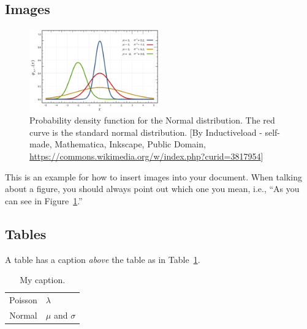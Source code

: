 \documentclass[12pt]{article}
\begin{document}
\subsection{Images}
\begin{figure}
    \begin{center}
    \includegraphics[width=0.5\textwidth]{figures/Normal_Distribution_PDF.pdf} %
    \caption{Probability density function for the Normal distribution. The red curve is the standard normal distribution. [By Inductiveload - self-made, Mathematica, Inkscape, Public Domain, \url{https://commons.wikimedia.org/w/index.php?curid=3817954}]}
    \label{fig:normal_sample}
    \end{center}
\end{figure}

This is an example for how to insert images into your document. When talking about a figure, you should always point out which one you mean, i.e., ``As you can see in Figure~\ref{fig:normal_sample}.''

\subsection{Tables}
A table has a caption \textit{above} the table as in Table~\ref{tab:my_label}.

\begin{table} %
    \centering
    \caption{My caption.}
    \label{tab:my_label}
    \begin{tabular}{c|l} %
        \hline
         Poisson & $\lambda$ \\ %
         Normal &  $\mu$ and $\sigma$\\ 
        \hline
    \end{tabular}
\end{table}
\end{document}
